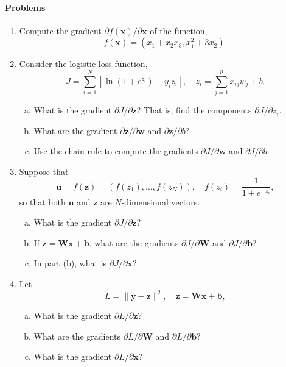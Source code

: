 \documentclass[11pt]{article}
\newcommand{\bbf}{\mathbf{b}}
\newcommand{\ubf}{\mathbf{u}}
\newcommand{\wbf}{\mathbf{w}}
\newcommand{\xbf}{\mathbf{x}}
\newcommand{\ybf}{\mathbf{y}}
\newcommand{\zbf}{\mathbf{z}}
\newcommand{\Wbf}{\mathbf{W}}
\begin{document}
\paragraph*{Problems}
\begin{enumerate}
\item Compute the gradient $\partial f(\xbf)/\partial \xbf$ of the function,
\[
    f(\xbf) = (x_1+x_2x_3,x_1^2+3x_2).
\]

\item Consider the logistic loss function,
\[
      J = \sum_{i=1}^N\left[ \ln(1+e^{z_i}) - y_iz_i \right], \quad z_i = \sum_{j=1}^p x_{ij}w_j + b.
\]
\begin{enumerate}[(a)]
\item What is the gradient $\partial J/\partial \zbf$?  That is, find the components $\partial J/\partial z_i$.
\item What are the gradient $\partial \zbf/\partial \wbf$ and $\partial \zbf/\partial b$?
\item Use the chain rule to compute the gradients $\partial J/\partial \wbf$ and $\partial J/\partial b$.
\end{enumerate}

\item Suppose that
\[
    \ubf = f(\zbf) = (f(z_1),\ldots,f(z_N)), \quad f(z_i) = \frac{1}{1+e^{-z_i}},
\]
so that both $\ubf$ and $\zbf$ are $N$-dimensional vectors.
\begin{enumerate}[(a)]
\item What is the gradient $\partial J/\partial \zbf$?
\item If $\zbf = \Wbf\xbf + \bbf$, what are the gradients $\partial J/\partial \Wbf$ and $\partial J/\partial \bbf$?
\item In part (b), what is $\partial J/\partial \xbf$?
\end{enumerate}

\item Let
\[
    L = \|\ybf -\zbf\|^2, \quad \zbf = \Wbf\xbf+\bbf,
\]
\begin{enumerate}[(a)]
\item What is the gradient $\partial L/\partial \zbf$?
\item What are the gradients $\partial L/\partial \Wbf$ and $\partial L/\partial \bbf$?
\item What is the gradient $\partial L/\partial \xbf$?
\end{enumerate}
\end{enumerate}
\end{document}
